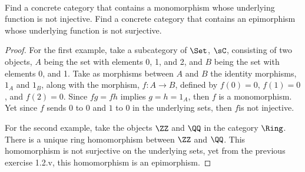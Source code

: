 \documentclass[../../main]{subfiles}
\begin{document}
\paragraph{}
\begin{exercise}
	Find a concrete category that contains a monomorphism whose underlying
	function is not injective. Find a concrete category that contains an
	epimorphism whose underlying function is not surjective.
\end{exercise}

\begin{proof}
	For the first example, take a subcategory of $\Set$, $\sC$, consisting
	of two objects, $A$ being the set with elements 0, 1, and 2, and $B$ being
	the set with elements 0, and 1. Take as morphisms between $A$ and $B$ the
	identity morphisms, $1_A$ and $1_B$, along with the morphism, $f \colon A
	\rightarrow B$, defined by $f(0) = 0$, $f(1) = 0$, and $f(2) = 0$. Since
	$fg= fh$ implies $g=h=1_A$, then $f$ is a monomorphism. Yet since $f$
	sends $0$ to $0$ and $1$ to $0$ in the underlying sets, then $f$is not
	injective.

	For the second example, take the objects $\ZZ$ and $\QQ$ in the
	category $\Ring$. There is a unique ring homomorphism between $\ZZ$ and $\QQ$. This homomorphism is not surjective on the underlying sets,
	yet from the previous exercise 1.2.v, this homomorphism is an epimorphism.
\end{proof}
\end{document}
